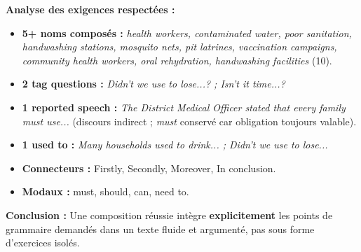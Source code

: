 \documentclass[11pt]{article}
\begin{document}
\begin{exoresolu}
\medskip
\textbf{Analyse des exigences respectées :}
\begin{itemize}
    \item \textbf{5+ noms composés :} \emph{health workers, contaminated water, poor sanitation, handwashing stations, mosquito nets, pit latrines, vaccination campaigns, community health workers, oral rehydration, handwashing facilities} (10).
    \item \textbf{2 tag questions :} \emph{Didn't we use to lose...? ; Isn't it time...?}
    \item \textbf{1 reported speech :} \emph{The District Medical Officer stated that every family must use...} (discours indirect ; \emph{must} conservé car obligation toujours valable).
    \item \textbf{1 used to :} \emph{Many households used to drink... ; Didn't we use to lose...}
    \item \textbf{Connecteurs :} Firstly, Secondly, Moreover, In conclusion.
    \item \textbf{Modaux :} must, should, can, need to.
\end{itemize}
\textbf{Conclusion :} Une composition réussie intègre \textbf{explicitement} les points de grammaire demandés dans un texte fluide et argumenté, pas sous forme d'exercices isolés.
\end{exoresolu}
\end{document}
